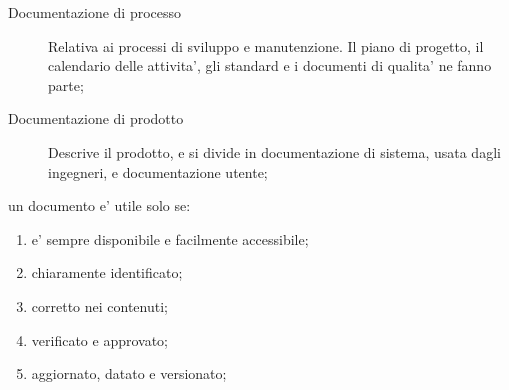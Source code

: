 \begin{description}
	\item[Documentazione di processo] Relativa ai processi di sviluppo e manutenzione. Il piano di progetto, il calendario delle attivita', gli standard e i documenti di qualita' ne fanno parte;
	\item[Documentazione di prodotto] Descrive il prodotto, e si divide in documentazione di sistema, usata dagli ingegneri, e documentazione utente;
\end{description}

un documento e' utile solo se:
\begin{enumerate}
	\item e' sempre disponibile e facilmente accessibile;
	\item chiaramente identificato;
	\item corretto nei contenuti;
	\item verificato e approvato;
	\item aggiornato, datato e versionato;
\end{enumerate}


